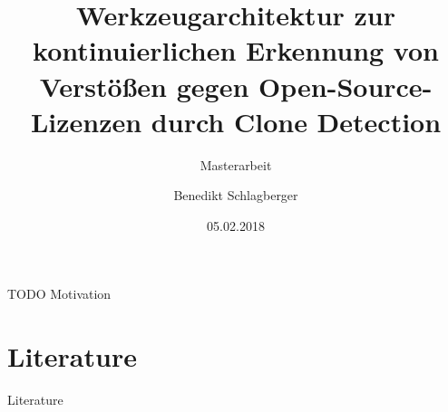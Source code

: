 \documentclass[utf8,14pt]{beamer} %
\title{Werkzeugarchitektur zur kontinuierlichen	Erkennung von Verstößen gegen Open-Source-Lizenzen durch Clone Detection}
\subtitle{{\small Masterarbeit}}
\author{Benedikt Schlagberger}
\institute[TUM]{{\small Technische Universität München}}
\date{05.02.2018}
\begin{document}
{
		\begin{frame}
			\titlepage
		\end{frame}
}

\begin{frame}
TODO Motivation
\end{frame}








\section*{Literature}
\begin{frame}{Literature}
\printbibliography{}
\end{frame}
\end{document}
